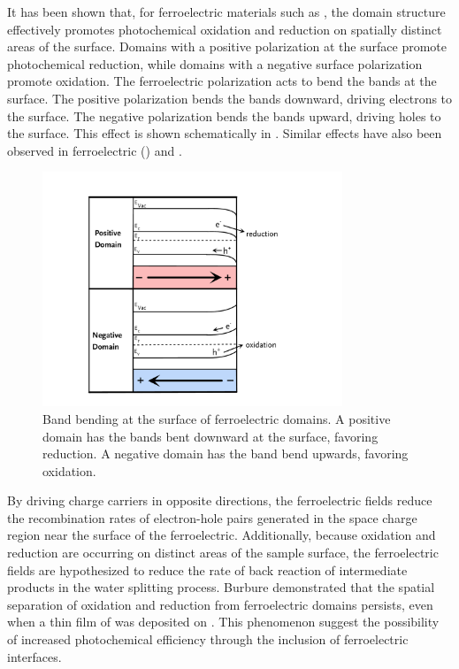 It has been shown that, for ferroelectric materials such as , the domain
structure effectively promotes photochemical oxidation and reduction on spatially distinct
areas of the surface.
\cite{Giocondi:2001gz,Burbure:2010go,Giocondi:2003ub,Giocondi:2001bi} Domains with a
positive polarization at the surface promote photochemical reduction, while domains with a
negative surface polarization promote oxidation. The ferroelectric polarization acts to
bend the bands at the surface. The positive polarization bends the bands downward, driving
electrons to the surface. The negative polarization bends the bands upward, driving holes
to the surface. This effect is shown schematically in . Similar
effects have also been observed in ferroelectric  () and
.\cite{Hanson:2006bq,Kalinin:2002iw,Tiwari:2009jv}

\begin{figure}
	\centerline{\includegraphics[width=0.8\textwidth]{ferroelectric.pdf}}
	\caption[Band bending at the surface of ferroelectric domains]{%
		Band bending at the surface of ferroelectric domains. A positive 
		domain has the bands bent downward at the surface, favoring 
		reduction. A negative domain has the band bend upwards, favoring 
		oxidation.}
	\label{fig:ferroelectric}
\end{figure}

By driving charge carriers in opposite directions, the ferroelectric fields reduce the
recombination rates of electron-hole pairs generated in the space charge region near the
surface of the ferroelectric. Additionally, because oxidation and reduction are occurring
on distinct areas of the sample surface, the ferroelectric fields are hypothesized to
reduce the rate of back reaction of intermediate products in the water splitting process.
Burbure\cite{Burbure:2010go,Burbure:2006cq,Burbure:2010ti} demonstrated that the spatial
separation of oxidation and reduction from ferroelectric domains persists, even when a
thin film of  was deposited on . This phenomenon suggest the
possibility of increased photochemical efficiency through the inclusion of ferroelectric
interfaces.


